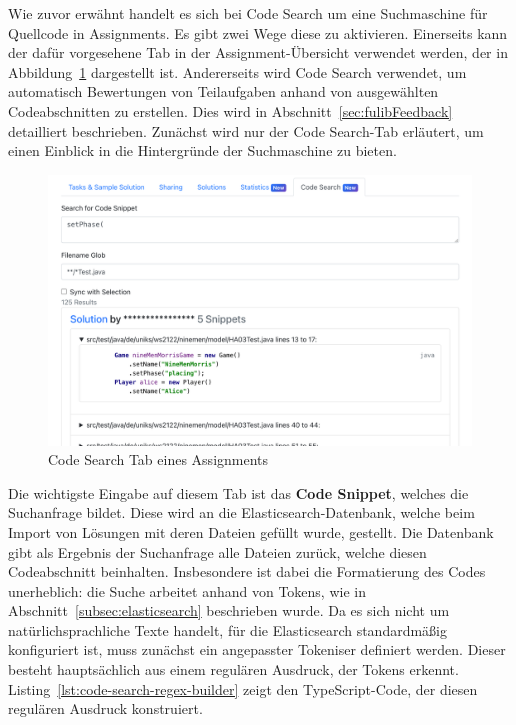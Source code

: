 Wie zuvor erwähnt handelt es sich bei Code Search um eine Suchmaschine für Quellcode in Assignments.
Es gibt zwei Wege diese zu aktivieren.
Einerseits kann der dafür vorgesehene Tab in der Assignment-Übersicht verwendet werden, der in Abbildung~\ref{fig:assignment-code-search} dargestellt ist.
Andererseits wird Code Search verwendet, um automatisch Bewertungen von Teilaufgaben anhand von ausgewählten Codeabschnitten zu erstellen.
Dies wird in Abschnitt~\ref{sec:fulibFeedback} detailliert beschrieben.
Zunächst wird nur der Code Search-Tab erläutert, um einen Einblick in die Hintergründe der Suchmaschine zu bieten.

\begin{figure}
    \centering
    \includegraphics[width=\textwidth]{images/assignment-code-search.png}
    \caption{Code Search Tab eines Assignments}
    \label{fig:assignment-code-search}
\end{figure}

Die wichtigste Eingabe auf diesem Tab ist das \textbf{Code Snippet}, welches die Suchanfrage bildet.
Diese wird an die Elasticsearch-Datenbank, welche beim Import von Lösungen mit deren Dateien gefüllt wurde, gestellt.
Die Datenbank gibt als Ergebnis der Suchanfrage alle Dateien zurück, welche diesen Codeabschnitt beinhalten.
Insbesondere ist dabei die Formatierung des Codes unerheblich:
die Suche arbeitet anhand von Tokens, wie in Abschnitt~\ref{subsec:elasticsearch} beschrieben wurde.
Da es sich nicht um natürlichsprachliche Texte handelt, für die Elasticsearch standardmäßig konfiguriert ist, muss zunächst ein angepasster Tokeniser definiert werden.
Dieser besteht hauptsächlich aus einem regulären Ausdruck, der Tokens erkennt.
Listing~\ref{lst:code-search-regex-builder} zeigt den TypeScript-Code, der diesen regulären Ausdruck konstruiert.

